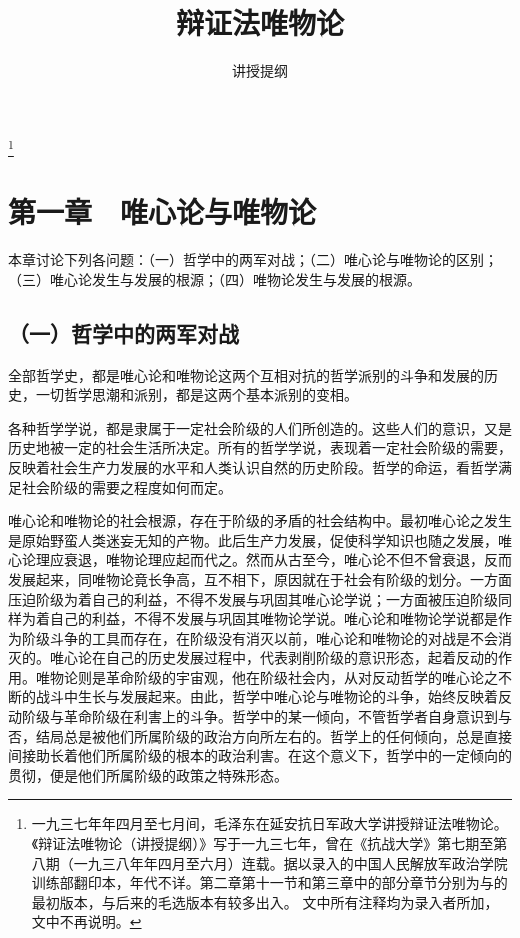 
\title{辩证法唯物论}
\date{讲授提纲}
\thanks{一九三七年年四月至七月间，毛泽东在延安抗日军政大学讲授辩证法唯物论。《辩证法唯物论（讲授提纲）》写于一九三七年，曾在《抗战大学》第七期至第八期（一九三八年年四月至六月）连载。据以录入的中国人民解放军政治学院训练部翻印本，年代不详。第二章第十一节和第三章中的部分章节分别为与的最初版本，与后来的毛选版本有较多出入。 文中所有注释均为录入者所加，文中不再说明。}
\maketitle


\section{第一章　唯心论与唯物论}

本章讨论下列各问题：（一）哲学中的两军对战；（二）唯心论与唯物论的区别；（三）唯心论发生与发展的根源；（四）唯物论发生与发展的根源。

\subsection{（一）哲学中的两军对战}

全部哲学史，都是唯心论和唯物论这两个互相对抗的哲学派别的斗争和发展的历史，一切哲学思潮和派别，都是这两个基本派别的变相。

各种哲学学说，都是隶属于一定社会阶级的人们所创造的。这些人们的意识，又是历史地被一定的社会生活所决定。所有的哲学学说，表现着一定社会阶级的需要，反映着社会生产力发展的水平和人类认识自然的历史阶段。哲学的命运，看哲学满足社会阶级的需要之程度如何而定。

唯心论和唯物论的社会根源，存在于阶级的矛盾的社会结构中。最初唯心论之发生是原始野蛮人类迷妄无知的产物。此后生产力发展，促使科学知识也随之发展，唯心论理应衰退，唯物论理应起而代之。然而从古至今，唯心论不但不曾衰退，反而发展起来，同唯物论竟长争高，互不相下，原因就在于社会有阶级的划分。一方面压迫阶级为着自己的利益，不得不发展与巩固其唯心论学说；一方面被压迫阶级同样为着自己的利益，不得不发展与巩固其唯物论学说。唯心论和唯物论学说都是作为阶级斗争的工具而存在，在阶级没有消灭以前，唯心论和唯物论的对战是不会消灭的。唯心论在自己的历史发展过程中，代表剥削阶级的意识形态，起着反动的作用。唯物论则是革命阶级的宇宙观，他在阶级社会内，从对反动哲学的唯心论之不断的战斗中生长与发展起来。由此，哲学中唯心论与唯物论的斗争，始终反映着反动阶级与革命阶级在利害上的斗争。哲学中的某一倾向，不管哲学者自身意识到与否，结局总是被他们所属阶级的政治方向所左右的。哲学上的任何倾向，总是直接间接助长着他们所属阶级的根本的政治利害。在这个意义下，哲学中的一定倾向的贯彻，便是他们所属阶级的政策之特殊形态。

